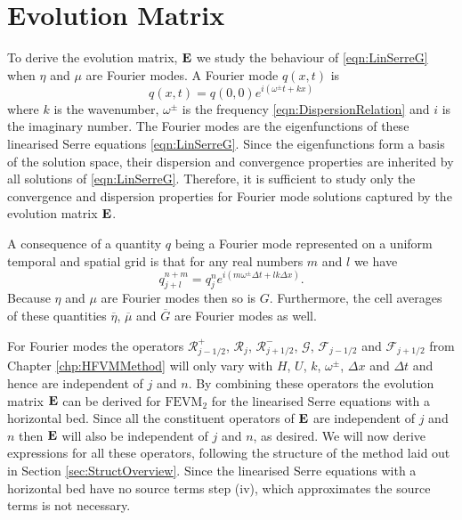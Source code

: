 \section{Evolution Matrix}
To derive the evolution matrix, $\mathbf{E}$ we study the behaviour of \eqref{eqn:LinSerreG} when $\eta$ and $\mu$ are Fourier modes. A Fourier mode $q(x,t)$ is
\begin{equation}
q(x,t) = q(0,0) e^{i\left(\omega^\pm t + kx\right)}
\label{eqn:FourierNode}
\end{equation}
where $k$ is the wavenumber, $\omega^\pm$ is the frequency \eqref{eqn:DispersionRelation} and $i$ is the imaginary number. The Fourier modes are the eigenfunctions of these linearised Serre equations \eqref{eqn:LinSerreG}. Since the eigenfunctions form a basis of the solution space, their dispersion and convergence properties are inherited by all solutions of \eqref{eqn:LinSerreG}. Therefore, it is sufficient to study only the convergence and dispersion properties for Fourier mode solutions captured by the evolution matrix $\mathbf{E}$. 

A consequence of a quantity $q$ being a Fourier mode represented on a uniform temporal and spatial grid is that for any real numbers $m$ and $l$ we have
\begin{equation}
q^{n + m}_{j + l} = q^n_j e^{ i \left(m \omega^\pm \Delta t + l k \Delta x\right)}.
\label{eqn:fourierfactor}
\end{equation}
Because $\eta$ and $\mu$ are Fourier modes then so is $G$. Furthermore, the cell averages of these quantities $\overline{\eta}$, $\overline{\mu}$ and $\overline{G}$ are Fourier modes as well.

For Fourier modes the operators $\mathcal{R}^+_{j-1/2}$, $\mathcal{R}_{j}$, $\mathcal{R}^-_{j+1/2}$, $\mathcal{G}$, $\mathcal{F}_{j-1/2}$ and $\mathcal{F}_{j+1/2}$ from Chapter \ref{chp:HFVMMethod} will only vary with $H$, $U$, $k$, $\omega^\pm$, $\Delta x$ and $\Delta t$ and hence are independent of $j$ and $n$. By combining these operators the evolution matrix $\mathbf{E}$ can be derived for $\text{FEVM}_2$ for the linearised Serre equations with a horizontal bed. Since all the constituent operators of $\mathbf{E}$ are independent of $j$ and $n$ then $\mathbf{E}$ will also be independent of $j$ and $n$, as desired. We will now derive expressions for all these operators, following the structure of the method laid out in Section \ref{sec:StructOverview}. Since the linearised Serre equations with a horizontal bed have no source terms step (iv), which approximates the source terms is not necessary.   

